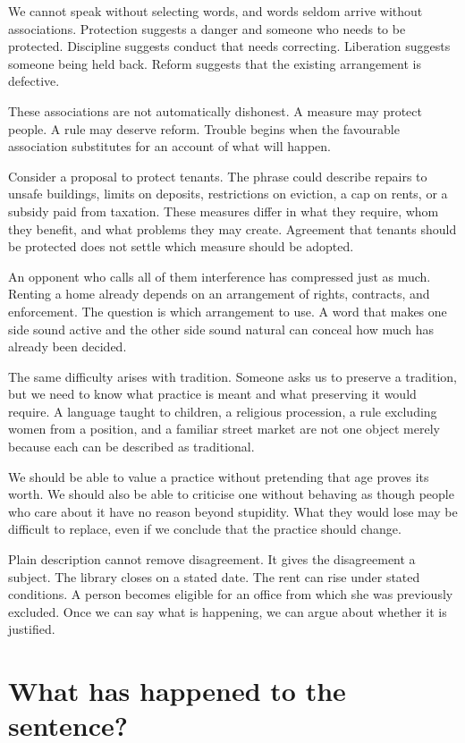 \documentclass[12pt,a4paper]{book}
\begin{document}
We cannot speak without selecting words, and words seldom arrive without associations. Protection suggests a danger and someone who needs to be protected. Discipline suggests conduct that needs correcting. Liberation suggests someone being held back. Reform suggests that the existing arrangement is defective.

These associations are not automatically dishonest. A measure may protect people. A rule may deserve reform. Trouble begins when the favourable association substitutes for an account of what will happen.

Consider a proposal to protect tenants. The phrase could describe repairs to unsafe buildings, limits on deposits, restrictions on eviction, a cap on rents, or a subsidy paid from taxation. These measures differ in what they require, whom they benefit, and what problems they may create. Agreement that tenants should be protected does not settle which measure should be adopted.

An opponent who calls all of them interference has compressed just as much. Renting a home already depends on an arrangement of rights, contracts, and enforcement. The question is which arrangement to use. A word that makes one side sound active and the other side sound natural can conceal how much has already been decided.

The same difficulty arises with tradition. Someone asks us to preserve a tradition, but we need to know what practice is meant and what preserving it would require. A language taught to children, a religious procession, a rule excluding women from a position, and a familiar street market are not one object merely because each can be described as traditional.

We should be able to value a practice without pretending that age proves its worth. We should also be able to criticise one without behaving as though people who care about it have no reason beyond stupidity. What they would lose may be difficult to replace, even if we conclude that the practice should change.

Plain description cannot remove disagreement. It gives the disagreement a subject. The library closes on a stated date. The rent can rise under stated conditions. A person becomes eligible for an office from which she was previously excluded. Once we can say what is happening, we can argue about whether it is justified.

\section*{What has happened to the sentence?}
\end{document}
